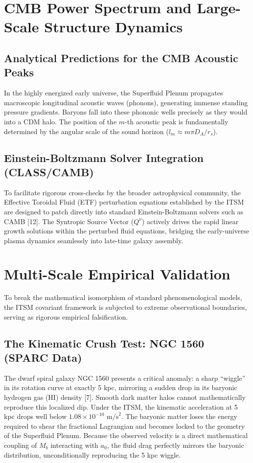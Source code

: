 \documentclass[aps,prd,onecolumn,linenumbers,superscriptaddress,nofootinbib]{revtex4-2}
\begin{document}
\section{CMB Power Spectrum and Large-Scale Structure Dynamics}

\subsection{Analytical Predictions for the CMB Acoustic Peaks}
In the highly energized early universe, the Superfluid Plenum propagates macroscopic longitudinal acoustic waves (phonons), generating immense standing pressure gradients. Baryons fall into these phononic wells precisely as they would into a CDM halo. The position of the $m$-th acoustic peak is fundamentally determined by the angular scale of the sound horizon ($l_m \approx m\pi D_A/r_s$). 

\subsection{Einstein-Boltzmann Solver Integration (CLASS/CAMB)}
To facilitate rigorous cross-checks by the broader astrophysical community, the Effective Toroidal Fluid (ETF) perturbation equations established by the ITSM are designed to patch directly into standard Einstein-Boltzmann solvers such as CAMB [12]. The Syntropic Source Vector ($Q^\nu$) actively drives the rapid linear growth solutions within the perturbed fluid equations, bridging the early-universe plasma dynamics seamlessly into late-time galaxy assembly.

\section{Multi-Scale Empirical Validation}

To break the mathematical isomorphism of standard phenomenological models, the ITSM covariant framework is subjected to extreme observational boundaries, serving as rigorous empirical falsification.

\subsection{The Kinematic Crush Test: NGC 1560 (SPARC Data)}
The dwarf spiral galaxy NGC 1560 presents a critical anomaly: a sharp ``wiggle'' in its rotation curve at exactly 5 kpc, mirroring a sudden drop in its baryonic hydrogen gas (HI) density [7]. Smooth dark matter halos cannot mathematically reproduce this localized dip. Under the ITSM, the kinematic acceleration at 5 kpc drops well below $1.08 \times 10^{-10} \text{ m/s}^2$. The baryonic matter loses the energy required to shear the fractional Lagrangian and becomes locked to the geometry of the Superfluid Plenum. Because the observed velocity is a direct mathematical coupling of $M_b$ interacting with $a_0$, the fluid drag perfectly mirrors the baryonic distribution, unconditionally reproducing the 5 kpc wiggle.
\end{document}

